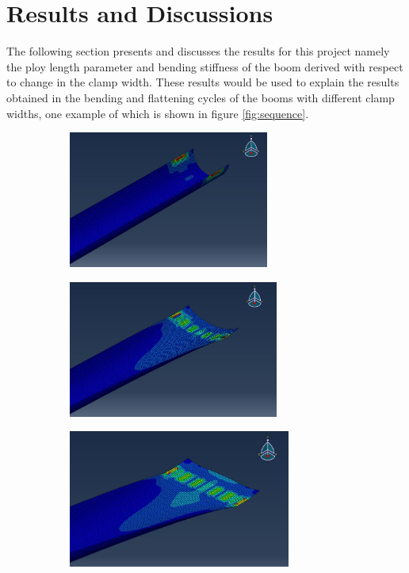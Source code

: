 \section{Results and Discussions}
\label{sec:results}
The following section presents and discusses the results for this project namely the ploy length parameter and  bending stiffness of the boom derived with respect to change in the clamp width. These results would be used to explain the results obtained in the bending and flattening cycles of the booms with different clamp widths, one example of which is shown in figure \ref{fig:sequence}. 
\begin{figure}[!hbt]
\begin{subfigure}{.5\linewidth}
\centering
\includegraphics[height=4.5cm]{images/1.JPG}
\caption{}
\label{fig:sub1}
\end{subfigure}%
\begin{subfigure}{.5\linewidth}
\centering
\includegraphics[height=4.5cm]{images/3.JPG}
\caption{}
\label{fig:sub2}
\end{subfigure}
\begin{subfigure}{.5\linewidth}
\centering
\includegraphics[height=4.5cm]{images/4.JPG}

\end{subfigure}
\end{figure}
